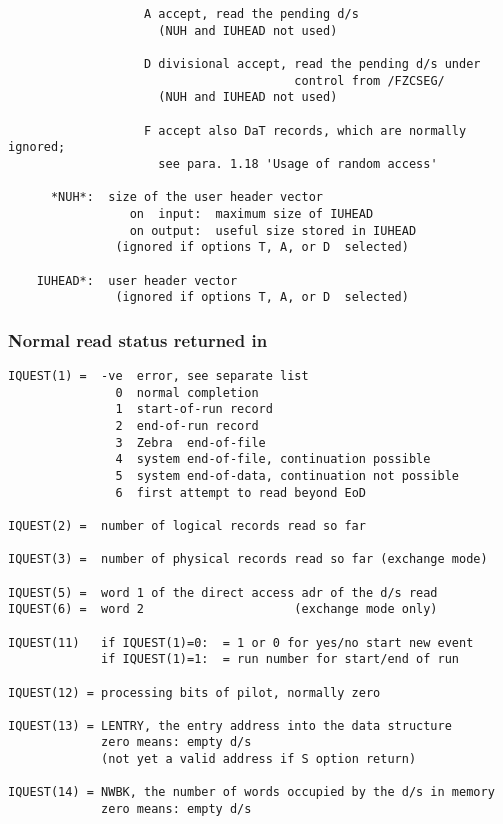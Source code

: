 {\begin{verbatim}
                   A accept, read the pending d/s
                     (NUH and IUHEAD not used)

                   D divisional accept, read the pending d/s under
                                        control from /FZCSEG/
                     (NUH and IUHEAD not used)

                   F accept also DaT records, which are normally ignored;
                     see para. 1.18 'Usage of random access'

      *NUH*:  size of the user header vector
                 on  input:  maximum size of IUHEAD
                 on output:  useful size stored in IUHEAD
               (ignored if options T, A, or D  selected)

    IUHEAD*:  user header vector
               (ignored if options T, A, or D  selected)
\end{verbatim}

\subsubsection*{Normal read status returned in }

\begin{verbatim}
IQUEST(1) =  -ve  error, see separate list
               0  normal completion
               1  start-of-run record
               2  end-of-run record
               3  Zebra  end-of-file
               4  system end-of-file, continuation possible
               5  system end-of-data, continuation not possible
               6  first attempt to read beyond EoD

IQUEST(2) =  number of logical records read so far

IQUEST(3) =  number of physical records read so far (exchange mode)

IQUEST(5) =  word 1 of the direct access adr of the d/s read
IQUEST(6) =  word 2                     (exchange mode only)

IQUEST(11)   if IQUEST(1)=0:  = 1 or 0 for yes/no start new event
             if IQUEST(1)=1:  = run number for start/end of run

IQUEST(12) = processing bits of pilot, normally zero

IQUEST(13) = LENTRY, the entry address into the data structure
             zero means: empty d/s
             (not yet a valid address if S option return)

IQUEST(14) = NWBK, the number of words occupied by the d/s in memory
             zero means: empty d/s


\end{verbatim}}
